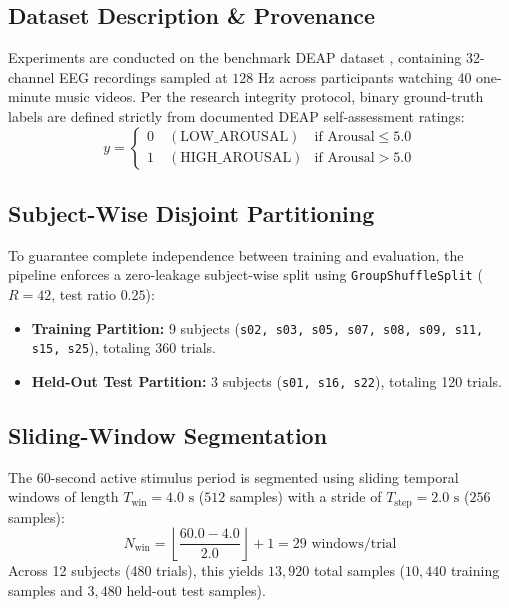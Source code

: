 \documentclass[journal]{IEEEtran}
\begin{document}
\subsection{Dataset Description \& Provenance}
Experiments are conducted on the benchmark DEAP dataset \cite{koelstra2012}, containing 32-channel EEG recordings sampled at $128\text{ Hz}$ across participants watching 40 one-minute music videos. Per the research integrity protocol, binary ground-truth labels are defined strictly from documented DEAP self-assessment ratings:
\begin{equation}
y = \begin{cases} 0 \quad (\text{LOW\_AROUSAL}) & \text{if } \text{Arousal} \le 5.0 \\ 1 \quad (\text{HIGH\_AROUSAL}) & \text{if } \text{Arousal} > 5.0 \end{cases}
\end{equation}

\subsection{Subject-Wise Disjoint Partitioning}
To guarantee complete independence between training and evaluation, the pipeline enforces a zero-leakage subject-wise split using \texttt{GroupShuffleSplit} ($R=42$, test ratio $0.25$):
\begin{itemize}
    \item \textbf{Training Partition:} 9 subjects (\texttt{s02, s03, s05, s07, s08, s09, s11, s15, s25}), totaling 360 trials.
    \item \textbf{Held-Out Test Partition:} 3 subjects (\texttt{s01, s16, s22}), totaling 120 trials.
\end{itemize}

\subsection{Sliding-Window Segmentation}
The 60-second active stimulus period is segmented using sliding temporal windows of length $T_{\text{win}} = 4.0\text{ s}$ ($512$ samples) with a stride of $T_{\text{step}} = 2.0\text{ s}$ ($256$ samples):
\begin{equation}
N_{\text{win}} = \left\lfloor \frac{60.0 - 4.0}{2.0} \right\rfloor + 1 = 29\text{ windows/trial}
\end{equation}
Across 12 subjects (480 trials), this yields $13{,}920$ total samples ($10{,}440$ training samples and $3{,}480$ held-out test samples).
\end{document}
